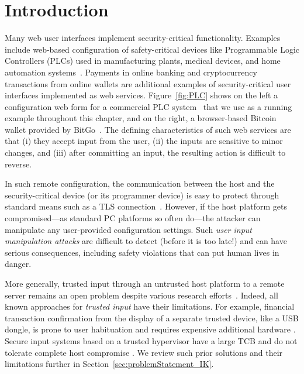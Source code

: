 \section{Introduction}
\label{sec:introduction}

Many web user interfaces implement security-critical functionality. Examples include web-based configuration of safety-critical devices like Programmable Logic Controllers (PLCs) used in manufacturing plants, medical devices, and home automation systems~\cite{7306669,siemens,siemens2,schneider}. Payments in online banking and cryptocurrency transactions from online wallets are additional examples of security-critical user interfaces implemented as web services. Figure~\ref{fig:PLC} shows on the left a configuration web form for a commercial PLC system~\cite{controlbyweb} that we use as a running example throughout this chapter, and on the right, a browser-based Bitcoin wallet provided by BitGo~\cite{bitgo}. The defining characteristics of such web services are that (i) they accept input from the user, (ii) the inputs are sensitive to minor changes, and (iii) after committing an input, the resulting action is difficult to reverse.

In such remote configuration, the communication between the host and the security-critical device (or its programmer device) is easy to protect through standard means such as a TLS connection~\cite{dierks2008transport}. However, if the host platform gets compromised---as standard PC platforms so often do---the attacker can manipulate any user-provided configuration settings. Such \emph{user input manipulation attacks} are difficult to detect (before it is too late!) and can have serious consequences, including safety violations that can put human lives in danger.


More generally, trusted input through an untrusted host platform to a remote server remains an open problem despite various research efforts~\cite{weiser2017sgxio,utp,zhou2012building,wimpyKernel,gyrus,weigold2011}. Indeed, all known approaches for \emph{trusted input} have their limitations. For example, financial transaction confirmation from the display of a separate trusted device, like a USB dongle, is prone to user habituation and requires expensive additional hardware \cite{weigold2011}. Secure input systems based on a trusted hypervisor have a large TCB and do not tolerate complete host compromise \cite{weiser2017sgxio}. We review such prior solutions and their limitations further in Section~\ref{sec:problemStatement_IK}.




